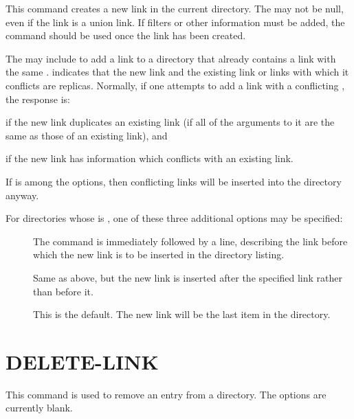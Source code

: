 This command creates a new link in the current directory.   The
 may not be null, even if the link is a union link.  
If filters
or other information must be added, the  command should be
used once the link has been created.

The  may include  to add
a link to a directory that already contains a link with the same
.    indicates  that the new link
and the existing link or links with which it conflicts are replicas.
Normally, if one attempts to add a link with a conflicting
, the response is: 
\begin{command}
\end{command}
if the new link duplicates an existing link (if all of the arguments
to it are the same as those of an existing link), and
\begin{command}
\end{command}
if the new link has information which conflicts with an existing link.

If  is among the options, then conflicting links will be
inserted into the directory anyway.

For directories whose  is ,
one of these three additional options may be specified:
\begin{description}
\item[] The  command is immediately
followed by a  line, describing the link before which the
new link is to be inserted in the directory listing.     
\item[] Same as above, but the new link is inserted after the
specified link rather than before it.
\item[]  This is the default.  The new link will be the last
item in the directory. 
\end{description}

\section{DELETE-LINK}

\begin{command}
  \commandsize
     \selectlines
\end{command}

This command is used to remove an entry from a directory.  The options
are currently blank.


